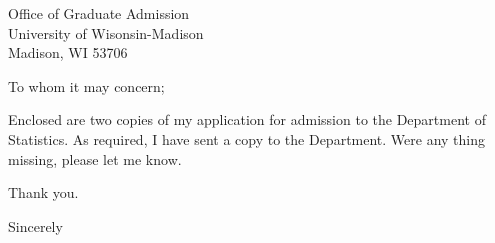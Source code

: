 \documentclass[11pt, a4paper]{letter}
\begin{document}
\address{Cheol Soo Lee\\
9-15 Sinlim Dong\\
Kwan Ak Gu\\
Seoul, Korea}

\begin{letter}
{Office of Graduate Admission\\
University of Wisonsin-Madison\\
Madison, WI 53706}

\opening{To whom it may concern;}
Enclosed are two copies of my application for admission to the Department of Statistics. As required, I have sent a copy to the Department. Were any thing missing, please let me know.


Thank you.
\closing{Sincerely}
\end{letter}
\end{document}
